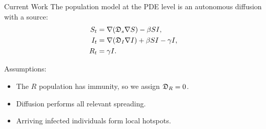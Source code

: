 \begin{slide}{Current Work}
	The population model at the PDE level is an autonomous diffusion with a source:
	\begin{align*}
	S_t	&=	\nabla (\mathfrak{D}_s \nabla S) - \beta SI,	\\
	I_t	&=	\nabla (\mathfrak{D}_I \nabla I) + \beta SI - \gamma I,	\\
	R_t	&=	\gamma I.
	\end{align*}
	
	\vspace{.5cm}
	Assumptions:
	\begin{itemize}
		\item The $R$ population has immunity, so we assign $\mathfrak{D}_R = 0$.
		\item Diffusion performs all relevant spreading.
		\item Arriving infected individuals form local hotspots.
	\end{itemize}
	
\end{slide}